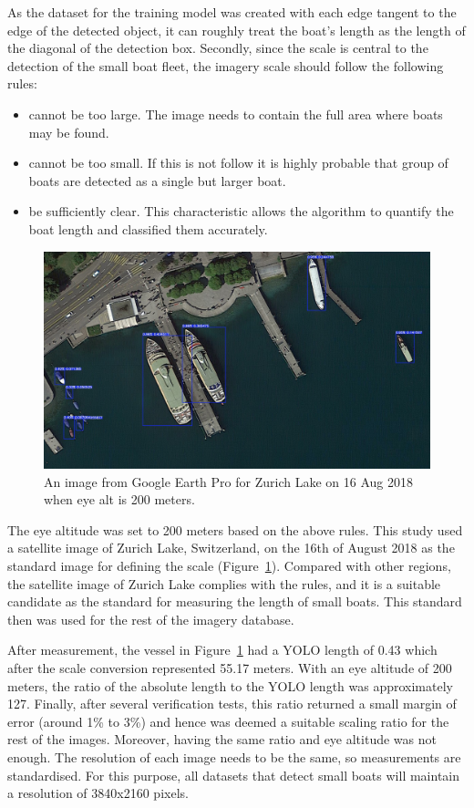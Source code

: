 As the dataset for the training model was created with each edge tangent to the edge of the detected object, it can roughly treat the boat's length as the length of the diagonal of the detection box. Secondly, since the scale is central to the detection of the small boat fleet, the imagery scale should follow the following rules:
\begin{itemize}
    \item cannot be too large. The image needs to contain the full area where boats may be found.
    \item cannot be too small. If this is not follow it is highly probable that group of boats are detected as a single but larger boat.
    \item be sufficiently clear. This characteristic allows the algorithm to quantify the boat length and classified them accurately.
\end{itemize}


\begin{figure}[t]
    \centering
    \includegraphics[width=\columnwidth]{img/zurich.jpeg}
    \caption{An image from Google Earth Pro for Zurich Lake on 16 Aug 2018 when eye alt is 200 meters.}
    \label{fig:zurich}
\end{figure}

The eye altitude was set to 200 meters based on the above rules. This study used a satellite image of Zurich Lake, Switzerland, on the 16th of August 2018 as the standard image for defining the scale (Figure~\ref{fig:zurich}). Compared with other regions, the satellite image of Zurich Lake complies with the rules, and it is a suitable candidate as the standard for measuring the length of small boats. This standard then was used for the rest of the imagery database.

After measurement, the vessel in Figure~\ref{fig:zurich} had a YOLO length of 0.43 which after the scale conversion represented 55.17 meters. With an eye altitude of 200 meters, the ratio of the absolute length to the YOLO length was approximately 127. Finally, after several verification tests, this ratio returned a small margin of error (around 1\% to 3\%) and hence was deemed a suitable scaling ratio for the rest of the images. Moreover, having the same ratio and eye altitude was not enough. The resolution of each image needs to be the same, so measurements are standardised. For this purpose, all datasets that detect small boats will maintain a resolution of 3840x2160 pixels.

